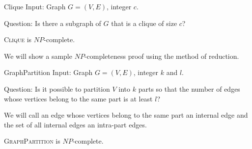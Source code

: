\begin{problem}{Clique}
    Input: Graph $G = (V, E)$, integer $c$.

    Question: Is there a subgraph of $G$ that is a clique of size $c$?
\end{problem}

\begin{thm}
\textsc{Clique} is $NP$-complete.
\end{thm}


We will show a sample $NP$-completeness proof using the method of reduction.

\begin{problem}{GraphPartition}
Input: Graph $G = (V, E)$, integer $k$ and $l$.

Question: Is it possible to partition $V$ into $k$ parts so that the number of edges
whose vertices belong to the same part is at least $l$?
\end{problem}

We will call an edge whose vertices belong to the same part an internal edge
and the set of all internal edges an intra-part edges.

\begin{thm}
\textsc{GraphPartition} is $NP$-complete.
\end{thm}

